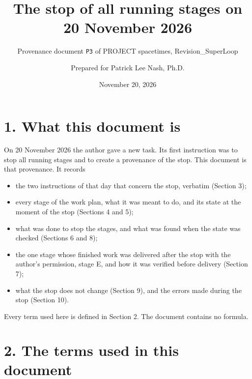 \documentclass[
  10pt,
]{article}
\title{The stop of all running stages on 20 November 2026}
\subtitle{Provenance document \texttt{P3} of PROJECT spacetimes,
Revision\_SuperLoop}
\author{Prepared for Patrick Lee Nash, Ph.D.}
\date{November 20, 2026}
\providecommand{\tightlist}{%
  \setlength{\itemsep}{0pt}\setlength{\parskip}{0pt}}
\begin{document}
\maketitle

\hypertarget{what-this-document-is}{%
\section{1. What this document is}\label{what-this-document-is}}

On 20 November 2026 the author gave a new task. Its first instruction
was to stop all running stages and to create a provenance of the stop.
This document is that provenance. It records

\begin{itemize}
\tightlist
\item
  the two instructions of that day that concern the stop, verbatim
  (Section 3);
\item
  every stage of the work plan, what it was meant to do, and its state
  at the moment of the stop (Sections 4 and 5);
\item
  what was done to stop the stages, and what was found when the state
  was checked (Sections 6 and 8);
\item
  the one stage whose finished work was delivered after the stop with
  the author's permission, stage E, and how it was verified before
  delivery (Section 7);
\item
  what the stop does not change (Section 9), and the errors made during
  the stop (Section 10).
\end{itemize}

Every term used here is defined in Section 2. The document contains no
formula.

\hypertarget{the-terms-used-in-this-document}{%
\section{2. The terms used in this
document}\label{the-terms-used-in-this-document}}
\end{document}
